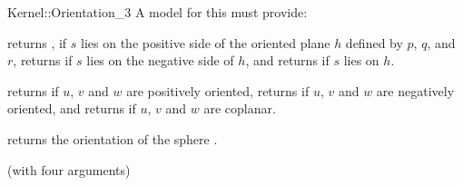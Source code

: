 \begin{ccRefFunctionObjectConcept}{Kernel::Orientation_3}
A model for this must provide:


{returns , if $s$ lies on the positive side of the oriented 
plane $h$ defined by $p$, $q$, and $r$, returns  if $s$ 
lies on the negative side of $h$, and returns  if $s$ lies
on $h$.}

{returns  if $u$, $v$ and $w$ are positively oriented,
returns  if $u$, $v$ and $w$ are negatively oriented,
and returns  if $u$, $v$ and $w$ are coplanar.}


{returns the orientation of the sphere .}

\ccRefines
{} (with four arguments)

\ccSeeAlso
{} \\

\end{ccRefFunctionObjectConcept}
